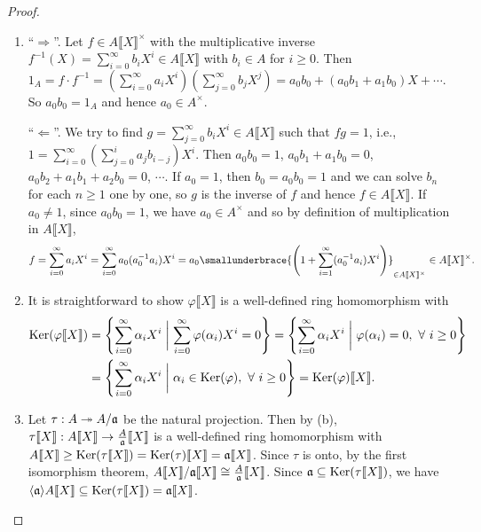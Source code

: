 \begin{proof}
    \begin{enumerate}
        \item 
            ``$\Rightarrow$''. Let $f \in A\llbracket X \rrbracket^\times$ with the multiplicative inverse $f^{-1}(X) = \sum_{i=0}^\infty b_iX^i \in A\llbracket X \rrbracket$ with $b_i \in A$ for $i \geq 0$. Then $1_A = f \cdot f^{-1} = (\sum_{i=0}^\infty a_iX^i)(\sum_{j=0}^\infty b_jX^j) = a_0b_0 + (a_0b_1 + a_1b_0)X + \cdots$. So $a_0b_0 = 1_A$ and hence $a_0 \in A^\times$. \par
            ``$\Leftarrow$''. We try to find $g = \sum_{j=0}^\infty b_iX^i \in A\llbracket X \rrbracket$ such that $fg = 1$, i.e., $1 = \sum_{i=0}^\infty (\sum_{j=0}^i a_jb_{i-j})X^i$. Then $a_0b_0 = 1$, $a_0b_1 + a_1b_0 = 0$, $a_0b_2 + a_1b_1 + a_2b_0= 0$, $\cdots$. If $a_0 = 1$, then $b_0 = a_0b_0 = 1$ and we can solve $b_n$ for each $n \geq 1$ one by one, so $g$ is the inverse of $f$ and hence $f \in A\llbracket X \rrbracket$. If $a_0 \neq 1$, since $a_0b_0 = 1$, we have $a_0 \in A^\times $ and so by definition of multiplication in $A\llbracket X \rrbracket$,
            \[f = \sum_{i=0}^\infty a_iX^i = \sum_{i=0}^\infty a_0(a_0^{-1}a_i)X^i = a_0 \smallunderbrace{\left(1+\sum_{i=1}^\infty (a_0^{-1}a_i)X^i\right)}_{\in A\llbracket X \rrbracket^\times} \in A\llbracket X \rrbracket^\times.\]
        \item
            It is straightforward to show $\varphi \llbracket X \rrbracket$ is a well-defined ring homomorphism with
            \begin{align*}
                \operatorname{Ker}(\varphi \llbracket X \rrbracket) &= \left\{\sum_{i=0}^\infty \alpha_i X^i \mathrel{\bigg |} \sum_{i=0}^\infty \varphi(\alpha_i)X^i = 0 \right\} = \left\{\sum_{i=0}^\infty \alpha_i X^i \mathrel{\bigg |} \varphi(\alpha_i) = 0, \ \forall \  i \geq 0\right\} \\
                                                      &= \left\{\sum_{i=0}^\infty \alpha_i X^i \mathrel{\bigg |} \alpha_i \in \operatorname{Ker}(\varphi), \ \forall \  i \geq 0 \right\} = \operatorname{Ker}(\varphi)\llbracket X \rrbracket.
            \end{align*}
        \item 
            Let $\tau: A \twoheadrightarrow A/\mathfrak{a}$ be the natural projection. Then by (b), $\tau \llbracket X \rrbracket: A\llbracket X \rrbracket \to \frac{A}{\mathfrak{a}}\llbracket X \rrbracket$ is a well-defined ring homomorphism with $A\llbracket X \rrbracket \geq \operatorname{Ker}(\tau \llbracket X \rrbracket) = \operatorname{Ker}(\tau) \llbracket X \rrbracket = \mathfrak{a} \llbracket X \rrbracket$. Since $\tau$ is onto, by the first isomorphism theorem, $A\llbracket X \rrbracket / \mathfrak{a} \llbracket X \rrbracket \cong \frac{A}{\mathfrak{a}}\llbracket X \rrbracket$. Since $\mathfrak{a} \subseteq \operatorname{Ker}(\tau \llbracket X \rrbracket)$, we have $\langle \mathfrak{a} \rangle A \llbracket X \rrbracket \subseteq \operatorname{Ker}(\tau \llbracket X \rrbracket) = \mathfrak{a} \llbracket X \rrbracket$. \par

\end{enumerate}
\end{proof}
